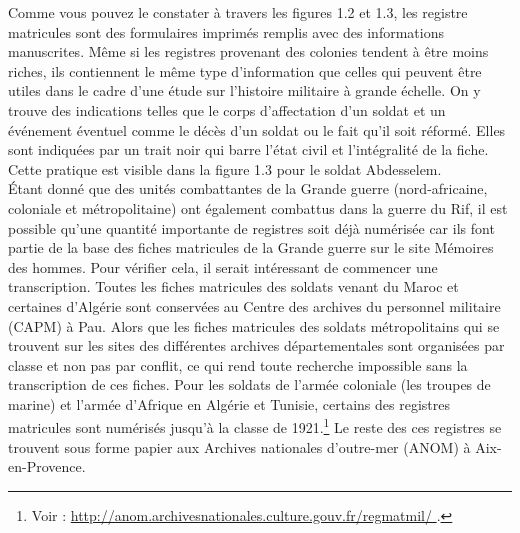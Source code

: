 Comme vous pouvez le constater à travers les figures 1.2 et 1.3, les registre matricules sont des formulaires imprimés remplis avec des informations manuscrites. Même si les registres provenant des colonies tendent à être moins riches, ils contiennent le même type d’information que celles qui peuvent être  utiles dans le cadre d’une étude sur l’histoire militaire à grande échelle. On y trouve des indications telles que le corps d’affectation d’un soldat et un événement éventuel comme le décès d’un soldat ou le fait qu’il soit réformé. Elles sont indiquées par un trait noir qui barre l’état civil et l’intégralité de la fiche. Cette pratique est visible dans la figure 1.3 pour le soldat Abdesselem. \\

Étant donné que des unités combattantes de la Grande guerre (nord-africaine, coloniale et métropolitaine) ont également combattus dans  la guerre du Rif, il est possible qu’une quantité importante de registres soit déjà numérisée car ils font partie de la base des fiches matricules de la Grande guerre sur le site Mémoires des hommes. Pour vérifier cela, il serait intéressant de commencer une transcription. Toutes les  fiches matricules des soldats venant du Maroc et certaines d’Algérie sont conservées  au Centre des archives du personnel militaire (CAPM) à Pau. Alors que les fiches matricules des soldats métropolitains qui se trouvent sur les sites des différentes archives départementales sont organisées par classe et non pas par conflit, ce qui rend toute recherche impossible sans la transcription de ces fiches. Pour les soldats de l’armée coloniale (les troupes de marine) et l’armée d'Afrique en Algérie et Tunisie, certains des registres matricules sont numérisés jusqu’à la classe de 1921.\footnote{ Voir : \url{http://anom.archivesnationales.culture.gouv.fr/regmatmil/ 
}.} Le reste des ces registres se trouvent sous forme papier aux Archives nationales d’outre-mer (ANOM) à Aix-en-Provence.\\

